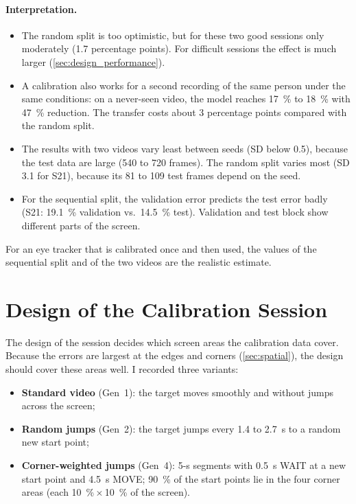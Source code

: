 \paragraph{Interpretation.}
\begin{itemize}[nosep]
  \item The random split is too optimistic, but for these two good sessions
        only moderately (1.7 percentage points). For difficult sessions the
        effect is much larger (\cref{sec:design_performance}).
  \item A calibration also works for a second recording of the same person
        under the same conditions: on a never-seen video, the model reaches
        \SI{17}{\percent} to \SI{18}{\percent} with \SI{47}{\percent} reduction.
        The transfer costs about 3 percentage points compared with the random
        split.
  \item The results with two videos vary least between seeds (SD below 0.5),
        because the test data are large (540 to 720 frames). The random split
        varies most (SD 3.1 for S21), because its 81 to 109 test frames depend
        on the seed.
  \item For the sequential split, the validation error predicts the test error
        badly (S21: \SI{19.1}{\percent} validation vs.\ \SI{14.5}{\percent}
        test). Validation and test block show different parts of the screen.
\end{itemize}
For an eye tracker that is calibrated once and then used, the values of the
sequential split and of the two videos are the realistic estimate.

\section{Design of the Calibration Session}
\label{sec:session_design}

The design of the session decides which screen areas the calibration data cover.
Because the errors are largest at the edges and corners (\cref{sec:spatial}), the
design should cover these areas well. I recorded three variants:
\begin{itemize}[nosep]
  \item \textbf{Standard video} (Gen~1): the target moves
        smoothly and without jumps across the screen;
  \item \textbf{Random jumps} (Gen~2): the target jumps every \SI{1.4}{} to
        \SI{2.7}{\second} to a random new start point;
  \item \textbf{Corner-weighted jumps} (Gen~4):
        5-s segments with \SI{0.5}{\second} WAIT at a new start point and
        \SI{4.5}{\second} MOVE; \SI{90}{\percent} of the start points lie in the
        four corner areas (each \SI{10}{\percent}\,$\times$\,\SI{10}{\percent}
        of the screen).
\end{itemize}

